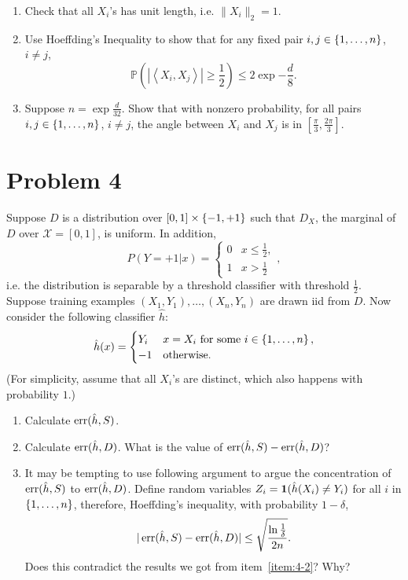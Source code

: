 \documentclass{article}
\DeclareMathOperator*{\err}{{\rm err}}
\newcommand{\PP}{\mathbb{P}} %
\newcommand{\Xcal}{\mathcal{X}} %
\newcommand*{\one}{{\bf 1}}
\newcommand{\inner}[2]{\left\langle #1,#2 \right\rangle}
\begin{document}
\begin{enumerate}
\item Check that all $X_i$'s has unit length, i.e. $\| X_i \|_2 = 1$.
\item Use Hoeffding's Inequality to show that for any fixed pair $i,j \in \cbr{1,\ldots,n}$, $i \neq j$,
\[ \PP(|\inner{X_i}{X_j}| \geq \frac{1}{2}) \leq 2\exp{-\frac{d}{8}}. \]
\item Suppose $n = \exp{\frac{d}{32}}$. Show that with nonzero probability,
for all pairs $i, j \in \cbr{1,\ldots,n}$, $i \neq j$,
the angle between $X_i$ and $X_j$ is in $[\frac{\pi}{3}, \frac{2\pi}{3}]$.
\end{enumerate}

\section*{Problem 4}
Suppose $D$ is a distribution over $[0,1] \times \cbr{-1,+1}$ such that $D_X$, the marginal
of $D$ over $\Xcal = [0,1]$, is uniform. In addition,
\[ P(Y=+1|x) = \begin{cases} 0 & x \leq \frac 1 2, \\ 1 & x > \frac 1 2 \end{cases}, \]
i.e. the distribution is separable by a threshold classifier with threshold $\frac 1 2$.
Suppose training examples $(X_1,Y_1), \ldots, (X_n, Y_n)$ are drawn iid from $D$.
Now consider the following classifier $\hat{h}$:
\[
\hat{h}(x) =
\begin{cases}
Y_i & x = X_i \text{ for some } i \in \cbr{1,\ldots,n}, \\
-1  & \text{otherwise.}
\end{cases}
\]
(For simplicity, assume that all $X_i$'s are distinct, which also happens with probability $1$.)

\begin{enumerate}
\item Calculate $\err(\hat{h}, S)$.
\item Calculate $\err(\hat{h}, D)$. What is the value of $\err(\hat{h}, S) - \err(\hat{h}, D)$?
\label{item:4-2}
\item It may be tempting to use following argument to argue the concentration of
$\err(\hat{h}, S)$ to $\err(\hat{h}, D)$. Define random variables
$Z_i = \one(\hat{h}(X_i) \neq Y_i)$ for all $i$ in $\cbr{1,\ldots,n}$, therefore, Hoeffding's inequality, with probability $1-\delta$,
\[ |\err(\hat{h}, S) - \err(\hat{h}, D)| \leq \sqrt{\frac{\ln\frac{1}{\delta}}{2n}}. \]
Does this contradict the results we got from item~\ref{item:4-2}? Why?
\end{enumerate}
\end{document}
